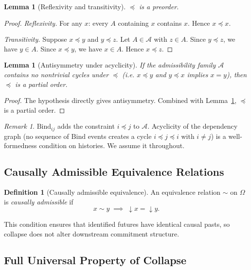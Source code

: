 \documentclass[12pt,a4paper]{article}
\newtheorem{lemma}[theorem]{Lemma}
\theoremstyle{definition}
\newtheorem{definition}[theorem]{Definition}
\theoremstyle{remark}
\newtheorem{remark}[theorem]{Remark}
\newcommand{\Bind}{\mathrm{Bind}}
\newcommand{\downset}[1]{\!\downarrow\!{#1}}
\begin{document}
\begin{lemma}[Reflexivity and transitivity]
\label{lem:preorder}
$\preceq$ is a preorder.
\end{lemma}

\begin{proof}
\textit{Reflexivity.} For any $x$: every $A$ containing $x$ contains $x$. Hence
$x\preceq x$.

\textit{Transitivity.} Suppose $x\preceq y$ and $y\preceq z$. Let $A\in\mathcal{A}$
with $z\in A$. Since $y\preceq z$, we have $y\in A$. Since $x\preceq y$, we have
$x\in A$. Hence $x\preceq z$.
\end{proof}

\begin{lemma}[Antisymmetry under acyclicity]
\label{lem:antisymmetry}
If the admissibility family $\mathcal{A}$ contains no nontrivial cycles under
$\preceq$ (i.e. $x\preceq y$ and $y\preceq x$ implies $x=y$), then $\preceq$ is a
partial order.
\end{lemma}

\begin{proof}
The hypothesis directly gives antisymmetry. Combined with Lemma~\ref{lem:preorder},
$\preceq$ is a partial order.
\end{proof}

\begin{remark}
$\Bind_{ij}$ adds the constraint $i\preceq j$ to $\mathcal{A}$. Acyclicity of the
dependency graph (no sequence of $\Bind$ events creates a cycle $i\preceq j\preceq i$
with $i\ne j$) is a well-formedness condition on histories. We assume it throughout.
\end{remark}

\subsection{Causally Admissible Equivalence Relations}

\begin{definition}[Causally admissible equivalence]
\label{def:causal-admissible}
An equivalence relation $\sim$ on $\Omega$ is \emph{causally admissible} if
\[
  x\sim y \;\implies\; \downset{x}=\downset{y}.
\]
\end{definition}

This condition ensures that identified futures have identical causal pasts, so
collapse does not alter downstream commitment structure.

\subsection{Full Universal Property of Collapse}
\end{document}
